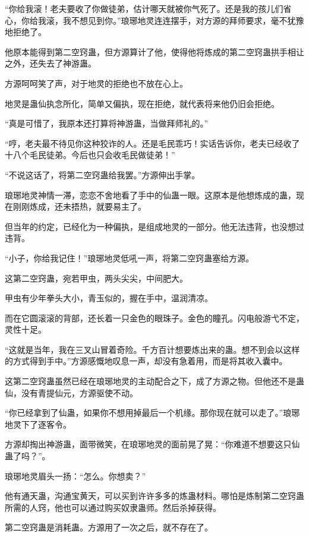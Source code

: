 
\begin{this_body}

“你给我滚！老夫要收了你做徒弟，估计哪天就被你气死了。还是我的孩儿们省心，你给我滚，我不想见到你。”琅琊地灵连连摆手，对方源的拜师要求，毫不犹豫地拒绝了。

他原本能得到第二空窍蛊，但方源算计了他，使得他将炼成的第二空窍蛊拱手相让之外，还失去了神游蛊。

方源呵呵笑了声，对于地灵的拒绝也不放在心上。

地灵是蛊仙执念所化，简单又偏执，现在拒绝，就代表将来他仍旧会拒绝。

“真是可惜了，我原本还打算将神游蛊，当做拜师礼的。”

“哼，老夫最不待见你这种狡诈的人。还是毛民乖巧！实话告诉你，老夫已经收了十八个毛民徒弟。今后也只会收毛民做徒弟！”

“不说这话了，将第二空窍蛊给我罢。”方源伸出手掌。

琅琊地灵神情一滞，恋恋不舍地看了手中的仙蛊一眼。这原本是他想炼成的蛊，现在刚刚炼成，还未捂热，就要易主了。

但当年的约定，已经化为一种偏执，是组成地灵的一部分。他无法违背，也没想过违背。

“小子，你给我记住！”琅琊地灵低吼一声，将第二空窍蛊塞给方源。

这第二空窍蛊，宛若甲虫，两头尖尖，中间肥大。

甲虫有少年拳头大小，青玉似的，握在手中，温润清凉。

而在它圆滚滚的背部，还长着一只金色的眼珠子。金色的瞳孔。闪电般游弋不定，灵性十足。

“这就是当年，我在三叉山冒着奇险。千方百计想要炼出来的蛊。想不到会以这样的方式得到手中。”方源感慨地叹息一声，却没有急着用，而是将其收入囊中。

这第二空窍蛊虽然已经在琅琊地灵的主动配合之下，成了方源之物。但他还不是蛊仙，没有青提仙元，方源驱使不动。

“你已经拿到了仙蛊，如果你不想用掉最后一个机缘。那你现在就可以走了。”琅琊地灵下了逐客令。

方源却掏出神游蛊，面带微笑，在琅琊地灵的面前晃了晃：“你难道不想要这只仙蛊了吗？”。

琅琊地灵眉头一扬：“怎么。你想卖？”

他有通天蛊，沟通宝黄天，可以买到许许多多的炼蛊材料。哪怕是炼制第二空窍蛊所需的人窍，他也可以通过购买奴隶蛊师。然后杀掉获得。

第二空窍蛊是消耗蛊。方源用了一次之后，就不存在了。


\end{this_body}
